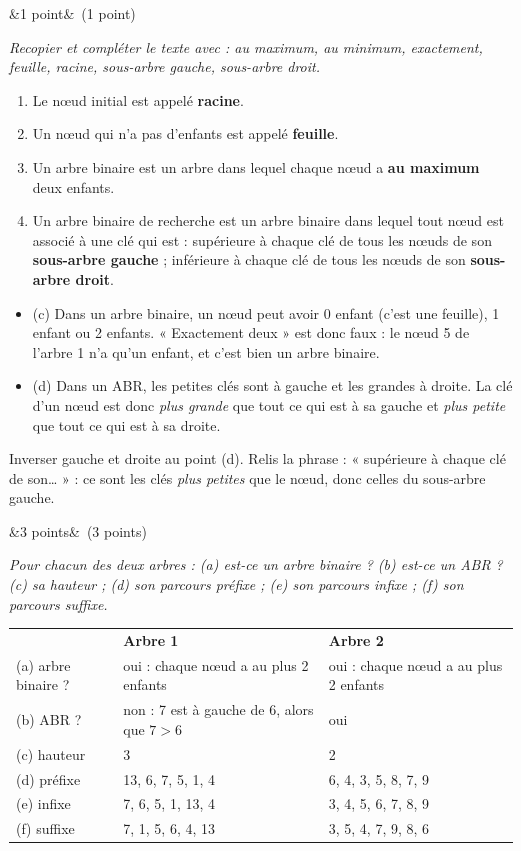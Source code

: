 \documentclass[11pt, a4paper]{exam}
\newcommand{\Q}[3]{\par\needspace{5\baselineskip}\bigskip\noindent{\large\bfseries Question #1}\ifx&#2&\else\ \textnormal{(#2)}\fi\par\nopagebreak\smallskip\noindent\textit{#3}\par\nopagebreak\smallskip}
\begin{document}
\Q{1 (a)}{1 point}{Recopier et compléter le texte avec : au maximum, au minimum, exactement, feuille, racine, sous-arbre gauche, sous-arbre droit.}
\begin{reponse}
\begin{enumerate}[label=(\alph*)]
\item Le nœud initial est appelé \textbf{racine}.
\item Un nœud qui n'a pas d'enfants est appelé \textbf{feuille}.
\item Un arbre binaire est un arbre dans lequel chaque nœud a \textbf{au maximum} deux enfants.
\item Un arbre binaire de recherche est un arbre binaire dans lequel tout nœud est associé à une clé qui est :
supérieure à chaque clé de tous les nœuds de son \textbf{sous-arbre gauche} ;
inférieure à chaque clé de tous les nœuds de son \textbf{sous-arbre droit}.
\end{enumerate}
\end{reponse}
\begin{itemize}
\item (c) Dans un arbre binaire, un nœud peut avoir 0 enfant (c'est une feuille), 1 enfant ou 2 enfants. « Exactement deux » est donc faux : le nœud 5 de l'arbre 1 n'a qu'un enfant, et c'est bien un arbre binaire.
\item (d) Dans un ABR, les petites clés sont à gauche et les grandes à droite. La clé d'un nœud est donc \emph{plus grande} que tout ce qui est à sa gauche et \emph{plus petite} que tout ce qui est à sa droite.
\end{itemize}
\begin{erreur}
Inverser gauche et droite au point (d). Relis la phrase : « supérieure à chaque clé de son\ldots{} » : ce sont les clés \emph{plus petites} que le nœud, donc celles du sous-arbre gauche.
\end{erreur}

\Q{1 (b)}{3 points}{Pour chacun des deux arbres : (a) est-ce un arbre binaire ? (b) est-ce un ABR ? (c) sa hauteur ; (d) son parcours préfixe ; (e) son parcours infixe ; (f) son parcours suffixe.}
\begin{reponse}
\renewcommand{\arraystretch}{1.25}
\begin{tabular}{@{}p{3.2cm}p{6.2cm}p{5.6cm}@{}}
 & \textbf{Arbre 1} & \textbf{Arbre 2} \\
(a) arbre binaire ? & oui : chaque nœud a au plus 2 enfants & oui : chaque nœud a au plus 2 enfants \\
(b) ABR ? & non : 7 est à gauche de 6, alors que $7 > 6$ & oui \\
(c) hauteur & 3 & 2 \\
(d) préfixe & 13, 6, 7, 5, 1, 4 & 6, 4, 3, 5, 8, 7, 9 \\
(e) infixe & 7, 6, 5, 1, 13, 4 & 3, 4, 5, 6, 7, 8, 9 \\
(f) suffixe & 7, 1, 5, 6, 4, 13 & 3, 5, 4, 7, 9, 8, 6 \\
\end{tabular}
\end{reponse}
\end{document}
